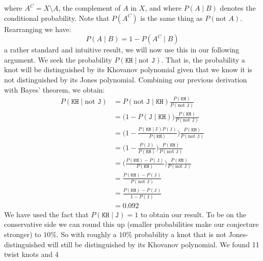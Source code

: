 \documentclass{article}
\theoremstyle{plain}
\begin{document}
        where $A^{C}=X\setminus{A}$, the complement of $A$ in $X$, and
        where $P(A\;|\;B)$ denotes the conditional probability. Note that
        $P(A^{C})$ is the same thing as $P(\textrm{not }A)$.
        Rearranging we have:
        \begin{equation}
            P(A\;|\;B)=1-P(A^{C}\;|\;B)
        \end{equation}
        a rather standard and intuitive result, we will now use this in our
        following argument. We seek the probability
        $P(\texttt{KH}\;|\;\textrm{not }\texttt{J})$.
        That is, the probability a knot will
        be distinguished by its Khovanov polynomial given that we know it is
        not distinguished by its Jones polynomial. Combining our previous derivation
        with Bayes' theorem, we obtain:
        \begin{align}
            P(\texttt{KH}\;|\;\textrm{not }\texttt{J})
            &=P(\textrm{not }\texttt{J}\;|\;\texttt{KH})
            \frac{P(\texttt{KH})}{P(\textrm{not }\texttt{J})}\\
            &=\big(1-P(\texttt{J}\;|\;\texttt{KH})\big)
                \frac{P(\texttt{KH})}{P(\textrm{not }\texttt{J})}\\
            &=\big(
                1-\frac{P(\texttt{KH}\;|\;\textrm{J})P(\texttt{J})}{P(\texttt{KH})}
            \big)
            \frac{P(\texttt{KH})}{P(\textrm{not }\texttt{J})}\\
            &=\big(
                1-\frac{P(\texttt{J})}{P(\texttt{KH})}
            \big)
            \frac{P(\texttt{KH})}{P(\textrm{not }\texttt{J})}\\
            &=\big(
                \frac{P(\texttt{KH})-P(\texttt{J})}{P(\texttt{KH})}
            \big)
            \frac{P(\texttt{KH})}{P(\textrm{not }\texttt{J})}\\
            &=\frac{P(\texttt{KH})-P(\texttt{J})}{P(\textrm{not }\texttt{J})}\\
            &=\frac{P(\texttt{KH})-P(\texttt{J})}{1-P(\texttt{J})}\\
            &=0.092
        \end{align}
        We have used the fact that $P(\texttt{KH}\;|\;\texttt{J})=1$ to obtain our
        result.
        To be on the conservative side we can round this up (smaller probabilities
        make our conjecture stronger) to $10\%$. So with roughly a $10\%$
        probability a knot that is not Jones-distinguished will still be
        distinguished by its Khovanov polynomial. We found 11 twist knots and 4
\end{document}

